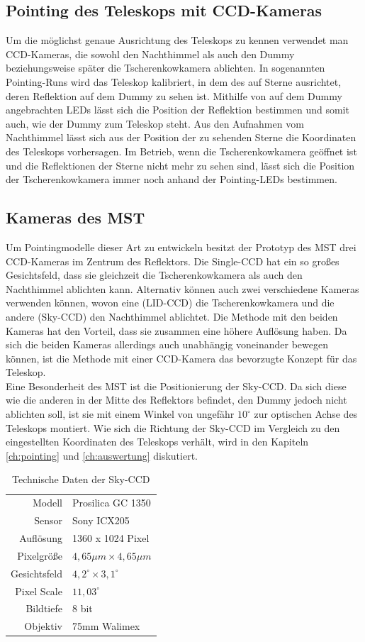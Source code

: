 \subsection{Pointing des Teleskops mit CCD-Kameras}
Um die möglichst genaue Ausrichtung des Teleskops zu kennen verwendet man CCD-Kameras, die sowohl den Nachthimmel als auch den Dummy beziehungsweise später die Tscherenkowkamera ablichten. In sogenannten Pointing-Runs wird das Teleskop kalibriert, in dem des auf Sterne ausrichtet, deren Reflektion auf dem Dummy zu sehen ist. Mithilfe von auf dem Dummy angebrachten LEDs lässt sich die Position der Reflektion bestimmen und somit auch, wie der Dummy zum Teleskop steht. Aus den Aufnahmen vom Nachthimmel lässt sich aus der Position der zu sehenden Sterne die Koordinaten des Teleskops vorhersagen. Im Betrieb, wenn die Tscherenkowkamera geöffnet ist und die Reflektionen der Sterne nicht mehr zu sehen sind, lässt sich die Position der Tscherenkowkamera immer noch anhand der Pointing-LEDs bestimmen.

\subsection{Kameras des MST}
Um Pointingmodelle dieser Art zu entwickeln besitzt der Prototyp des MST drei CCD-Kameras im Zentrum des Reflektors. Die Single-CCD hat ein so großes Gesichtsfeld, dass sie gleichzeit die Tscherenkowkamera als auch den Nachthimmel ablichten kann. Alternativ können auch zwei verschiedene Kameras verwenden können, wovon eine (LID-CCD) die Tscherenkowkamera und die andere (Sky-CCD) den Nachthimmel ablichtet. Die Methode mit den beiden Kameras hat den Vorteil, dass sie zusammen eine höhere Auflösung haben. Da sich die beiden Kameras allerdings auch unabhängig voneinander bewegen können, ist die Methode mit einer CCD-Kamera das bevorzugte Konzept für das Teleskop\cite{pos}.\\
Eine Besonderheit des MST ist die Positionierung der Sky-CCD. Da sich diese wie die anderen in der Mitte des Reflektors befindet, den Dummy jedoch nicht ablichten soll, ist sie mit einem Winkel von ungefähr $10^{\circ}$ zur optischen Achse des Teleskops montiert. Wie sich die Richtung der Sky-CCD im Vergleich zu den eingestellten Koordinaten des Teleskops verhält, wird in den Kapiteln \ref{ch:pointing} und \ref{ch:auswertung} diskutiert.

\begin{table}[htbp]
\centering
\begin{tabular}{r|l}
\toprule
Modell & Prosilica GC 1350\\
Sensor & Sony ICX205\\
Auflösung & 1360 x 1024 Pixel \\
Pixelgröße & $4,65\unit{\mu m}\times 4,65\unit{\mu m}$\\
Gesichtsfeld & $4,2^{\circ} \times 3,1^{\circ} $\\
Pixel Scale & $11,03^{\circ}$\\
Bildtiefe & 8 bit\\
Objektiv & 75mm Walimex\\
\bottomrule
\end{tabular}
\caption{Technische Daten der Sky-CCD}
\label{tab:SkyCCD}
\end{table}

